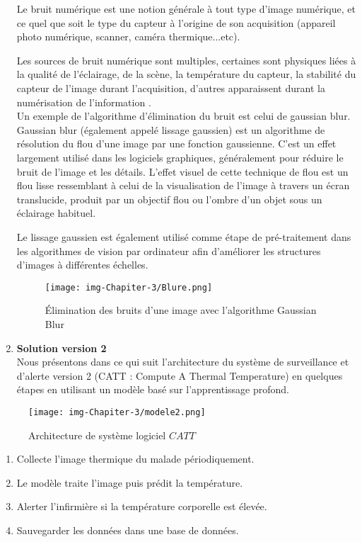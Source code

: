 \documentclass[12pt]{article}
\begin{document}
\begin{enumerate}
Le bruit numérique est une notion générale à tout type d'image numérique, et ce quel que soit le type du capteur à l'origine de son acquisition (appareil photo numérique, scanner, caméra thermique...etc). 

Les sources de bruit numérique sont multiples, certaines sont physiques liées à la qualité de l’éclairage, de la scène, la température du capteur, la stabilité du capteur de l'image durant l'acquisition, d'autres apparaissent durant la numérisation de l'information \cite{48}.\\

Un exemple de l'algorithme d'élimination du bruit est celui de gaussian blur.\\
Gaussian blur (également appelé lissage gaussien) est un algorithme de résolution du flou d'une image par une fonction gaussienne. C'est un effet largement utilisé dans les logiciels graphiques, généralement pour réduire le bruit de l'image et les détails. L’effet visuel de cette technique de flou est un flou lisse ressemblant à celui de la visualisation de l’image à travers un écran translucide, produit par un objectif flou ou l’ombre d’un objet sous un éclairage habituel. 

Le lissage gaussien est également utilisé comme étape de pré-traitement dans les algorithmes de vision par ordinateur afin d'améliorer les structures d'images à différentes échelles.

\begin{figure}[h]
	\centering
	\texttt{[image: img-Chapiter-3/Blure.png]}
	\caption{Élimination des bruits d'une image avec l'algorithme Gaussian Blur}
\end{figure}
	\item \textbf{Solution version 2}\\
	Nous présentons dans ce qui suit l'architecture du système de surveillance et d'alerte version 2 (CATT : Compute A Thermal Temperature)  en quelques étapes en utilisant un modèle basé sur l'apprentissage profond. 
\end{enumerate}
\begin{figure}[h]
	\centering
	\texttt{[image: img-Chapiter-3/modele2.png]}
	\caption{Architecture de système logiciel $CATT$}
	\label{fig:achdelasolu2}
\end{figure}
\begin{enumerate}
	\item Collecte l'image thermique du malade périodiquement.
	\item Le modèle traite l'image puis prédit la température.
	\item Alerter l'infirmière si la température corporelle est élevée.
	\item Sauvegarder les données dans une base de données.
\end{enumerate}
\end{document}
